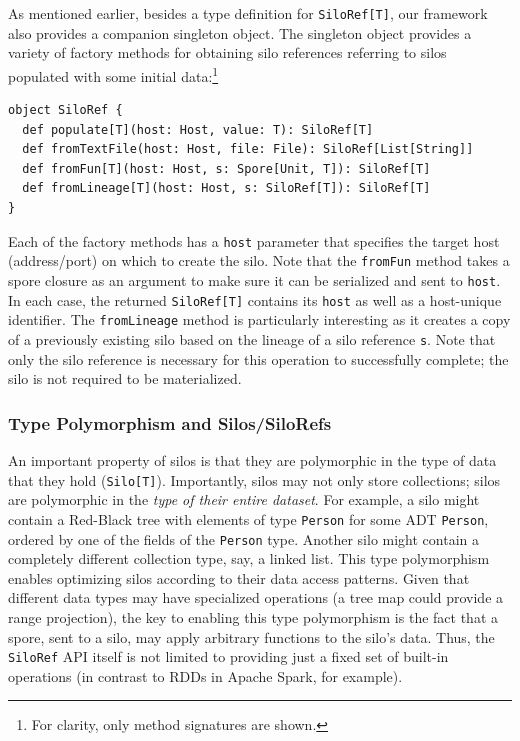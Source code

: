 \documentclass{jfp1}
\begin{document}
As mentioned earlier, besides a type definition for \verb|SiloRef[T]|, our framework also provides a
companion singleton object. The singleton object
provides a variety of factory methods for obtaining silo references referring to silos populated
with some initial data:\footnote{For clarity, only method signatures are shown.}

\begin{lstlisting}
object SiloRef {
  def populate[T](host: Host, value: T): SiloRef[T]
  def fromTextFile(host: Host, file: File): SiloRef[List[String]]
  def fromFun[T](host: Host, s: Spore[Unit, T]): SiloRef[T]
  def fromLineage[T](host: Host, s: SiloRef[T]): SiloRef[T]
}
\end{lstlisting}
\noindent
Each of the factory methods has a \verb|host| parameter that specifies the
target host (address/port) on which to create the silo. Note that the
\verb|fromFun| method takes a spore closure as an argument to make sure it can
be serialized and sent to \verb|host|. In each case, the returned
\verb|SiloRef[T]| contains its \verb|host| as well as a
host-unique identifier. The \verb|fromLineage| method is
particularly interesting as it creates a copy of a previously existing silo
based on the lineage of a silo reference \verb|s|. Note that only the silo
reference is necessary for this operation to successfully complete; the silo
is not required to be materialized.

\subsubsection{Type Polymorphism and Silos/SiloRefs}

An important property of silos is that they are polymorphic in the type of data
that they hold (\verb|Silo[T]|). Importantly, silos may not only store collections;
silos are polymorphic in the {\em type of their entire
dataset}. For example, a silo might contain a Red-Black tree with elements of
type \verb|Person| for some ADT \verb|Person|, ordered by one of the fields of
the \verb|Person| type. Another silo might contain a completely different
collection type, say, a linked list. This type polymorphism enables optimizing
silos according to their data access patterns. Given that different data types
may have specialized operations (\eg a tree map could provide a range
projection), the key to enabling this type polymorphism is the fact that a
spore, sent to a silo, may apply arbitrary functions to the silo's data. Thus,
the \verb|SiloRef| API itself is not limited to providing just a fixed set of
built-in operations (in contrast to RDDs in Apache Spark, for example).
\end{document}
